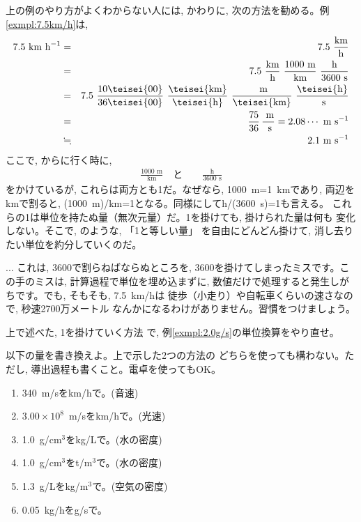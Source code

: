 上の例のやり方がよくわからない人には, かわりに, 
次の方法を勧める。例\ref{exmpl:7.5km/h}は,
\begin{eqnarray}
7.5\,\,\text{km h}^{-1}&=&7.5\,\,\frac{\text{km}}{\text{h}}\label{eq:unit_conv_mult1_02}\\
&=&7.5\,\,\frac{\text{km}}{\text{h}}\,\,\frac{1000\text{ m}}{\text{km}}\,\,\frac{\text{h}}{3600\text{ s}}\label{eq:unit_conv_mult1_04}\\
&=&7.5\,\,\frac{10\teisei{00}}{36\teisei{00}}\,\,\frac{\teisei{\text{km}}}{\teisei{\text{h}}}\,\,\frac{\text{ m}}{\teisei{\text{km}}}\,\,\frac{\teisei{\text{h}}}{\text{ s}}\label{eq:unit_conv_mult1_06}\\
&=&\frac{75}{36}\,\frac{\text{ m}}{\text{ s}}=2.08\cdots\text{ m s}^{-1}\\
&\fallingdotseq&2.1\text{ m s}^{-1}\label{eq:unit_conv_mult1_08}
\end{eqnarray}
ここで, からに行く時に, 
\begin{eqnarray}
\frac{1000\text{ m}}{\text{km}}\quad\text{と}\quad\quad\frac{\text{h}}{3600\text{ s}}\label{eq:unit_conv_times1}
\end{eqnarray}
をかけているが, これらは両方とも1だ。なぜなら, 1000~m=1~kmであり, 
両辺をkmで割ると, (1000~m)/km=1となる。同様にしてh/(3600~s)=1も言える。
これらの1は単位を持たぬ量（無次元量）だ。1を掛けても, 掛けられた量は何も
変化しない。そこで, のような, 「1と等しい量」
を自由にどんどん掛けて, 消し去りたい単位を約分していくのだ。

\begin{freqmiss}{\small{}... これは, 3600で割らねばならぬところを, 
3600を掛けてしまったミスです。この手のミスは, 計算過程で単位を埋め込まずに, 
数値だけで処理すると発生しがちです。でも, そもそも, 7.5~km/hは
徒歩（小走り）や自転車くらいの速さなので, 秒速2700万メートル
なんかになるわけがありません。習慣をつけましょう。}\end{freqmiss}

\begin{q}\label{q:unit_conv_mult1} 上で述べた, 1を掛けていく方法
で, 例\ref{exmpl:2.0g/s}の単位換算をやり直せ。\end{q}

\begin{q}\label{q:alg_unit4} 以下の量を書き換えよ。上で示した2つの方法の
どちらを使っても構わない。ただし, 導出過程も書くこと。電卓を使ってもOK。
\begin{enumerate}
\item 340~m/sをkm/hで。(音速)
\item $3.00\times10^8$~m/sをkm/hで。(光速)
\item 1.0~g/cm$^3$をkg/Lで。(水の密度)
\item 1.0~g/cm$^3$をt/m$^3$で。(水の密度)
\item 1.3~g/Lをkg/m$^3$で。(空気の密度)
\item 0.05~kg/hをg/sで。
\end{enumerate}
\end{q}
\mv

